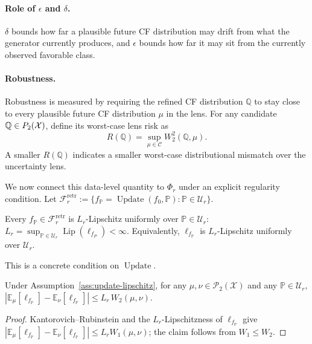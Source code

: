 \paragraph{Role of $\epsilon$ and $\delta$.}
$\delta$ bounds how far a plausible future CF distribution may drift from what the generator currently produces, and $\epsilon$ bounds how far it may sit from the currently observed favorable class. 




\paragraph{Robustness.}
Robustness is measured by requiring the refined CF distribution $\mathbb{Q}$ to stay close to every plausible future CF distribution $\mu$ in the lens. 
For any candidate $\mathbb{Q}\in\mathcal \mathcal{P}_2(\mathcal X)$, define its worst-case lens risk as
\begin{equation}
   \label{eq:worstcaserisk}
R(\mathbb{Q})
=
\sup_{\mu\in\mathcal C}W_2^2(\mathbb{Q},\mu). 
\end{equation} 
A smaller $R(\mathbb{Q})$ indicates a smaller worst-case distributional mismatch over the uncertainty lens. 

We now connect this data-level quantity to $\Phi_r$ under an explicit regularity condition. Let $\mathcal F_r^{\mathrm{retr}}:=\{f_{\mathbb P}=\operatorname{Update}(f_0,\mathbb P):\mathbb P\in\mathcal U_r\}$.
\begin{assumption}\label{ass:update-lipschitz}
    Every $f_{\mathbb P} \in \mathcal F_r^{\mathrm{retr}}$ is $L_r$-Lipschitz uniformly over $\mathbb P\in\mathcal U_r$: $L_r=\sup_{\mathbb P\in\mathcal U_r}\operatorname{Lip}(\ell_{f_P})<\infty$. Equivalently, $\ell_{f_\mathbb{P}}$ is $L_r$-Lipschitz uniformly over $\mathcal U_r$.
\end{assumption}
This is a concrete condition on $\operatorname{Update}$.

\begin{lemma}\label{lem:score-diff}
Under Assumption~\ref{ass:update-lipschitz}, for any $\mu,\nu\in\mathcal P_2(\mathcal X)$ and any $\mathbb P\in\mathcal U_r$, $\left|\mathbb E_\mu[\ell_{f_\mathbb{P}}] - \mathbb E_\nu[\ell_{f_\mathbb{P}}]\right| \le L_r\,W_2(\mu,\nu)$.
\end{lemma}
\begin{proof}
Kantorovich--Rubinstein and the $L_r$-Lipschitzness of $\ell_{f_\mathbb{P}}$ give $\left|\mathbb E_\mu[\ell_{f_\mathbb{P}}]-\mathbb E_\nu[\ell_{f_\mathbb{P}}]\right|\le L_r W_1(\mu,\nu)$; the claim follows from $W_1\le W_2$.
\end{proof}

